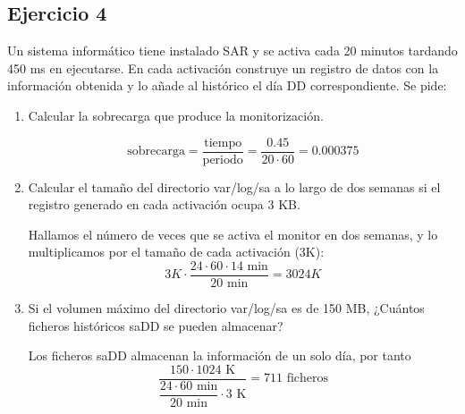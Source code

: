 \subsection{Ejercicio 4}
\noindent
Un sistema informático tiene instalado SAR y se activa cada 20 minutos tardando 450 ms en ejecutarse. En cada activación construye un registro de datos con la información obtenida y lo añade al histórico el día DD correspondiente. Se pide:
\begin{enumerate}
    \item Calcular la sobrecarga que produce la monitorización.
\begin{tcolorbox}[colback=white,colframe=cyan!50!black,fonttitle=\bfseries]
\[
\text{sobrecarga}=\dfrac{\text{tiempo}}{\text{periodo}}=\dfrac{0.45}{20\cdot 60}=0.000375
\]
\end{tcolorbox}    
    \item Calcular el tamaño del directorio var/log/sa a lo largo de dos semanas si el registro generado en cada activación ocupa 3 KB.
\begin{tcolorbox}[colback=white,colframe=cyan!50!black,fonttitle=\bfseries]
Hallamos el número de veces que se activa el monitor en dos semanas, y lo multiplicamos por el tamaño de cada activación (3K):
\[
3K\cdot\dfrac{24\cdot 60 \cdot 14\text{ min}}{20\text{ min}}=3024K
\]
\end{tcolorbox}    
    \item Si el volumen máximo del directorio var/log/sa es de 150 MB, ¿Cuántos ficheros históricos saDD se pueden almacenar?
\begin{tcolorbox}[colback=white,colframe=cyan!50!black,fonttitle=\bfseries]
Los ficheros saDD almacenan la información de un solo día, por tanto
\[
\dfrac{150\cdot 1024\text{ K}}{\dfrac{24\cdot 60\text{ min}}{20\text{ min}}\cdot 3\text{ K}}=711 \text{ ficheros}
\]
\end{tcolorbox}    
\end{enumerate}
